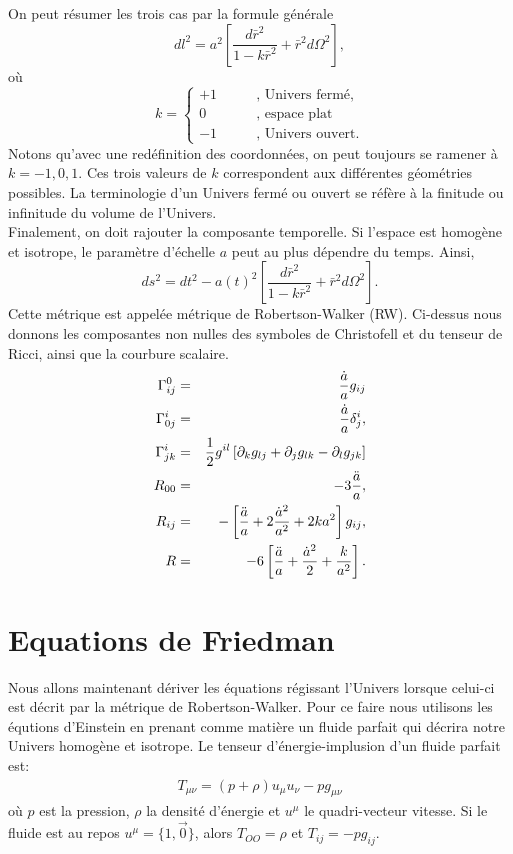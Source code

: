 \documentclass[a4paper,12pt]{report}
\theoremstyle{plain}
\theoremstyle{plain}
\begin{document}
  On peut r\'esumer les trois cas par la formule g\'en\'erale 
  \begin{equation}
  dl^2=a^2\left[ \frac{d\bar{r}^2}{1-k\bar{r}^2} + \bar{r}^2d\Omega^2\right], 
  \end{equation} 
  o\`{u} 
  $$ k= \begin{cases}
   +1& \qquad  \text{, Univers ferm\'e,} \\
   0 &\qquad \text{, espace plat} \\
   -1 &\qquad \text{, Univers ouvert.} 
   \end{cases}$$
   Notons qu'avec une red\'efinition des coordonn\'ees, on peut toujours se ramener \`a\\ $k=-1,0,1$. Ces trois valeurs de $k$ correspondent aux diff\'erentes g\'eom\'etries possibles. La terminologie d'un Univers ferm\'e ou ouvert se r\'ef\`ere \`a la finitude ou infinitude du volume de l'Univers. \\
   
   Finalement, on doit rajouter la composante temporelle. Si l'espace est homog\`ene et isotrope, le param\`etre d'\'echelle $a$ peut au plus d\'ependre du temps. Ainsi, 
   \begin{equation}
    ds^2 = dt^2 -a(t)^2 \left[ \frac{d\bar{r}^2}{1-k\bar{r}^2} +\bar{r}^2 d \Omega ^2\right] .
   \end{equation}
  Cette m\'etrique est appel\'ee m\'etrique de Robertson-Walker (RW). Ci-dessus nous donnons les composantes non nulles des symboles de Christofell et du tenseur de Ricci, ainsi que la courbure scalaire.  
  \begin{eqnarray}
   \Gamma _{ij}^0&= & \frac{\dot{a}}{a} g_{ij} \cr
   \Gamma_{0j}^i &=& \frac{\dot{a}}{a} \delta_j^i, \cr
   \Gamma_{jk}^i &=& \frac{1}{2} g^{il} \left[ \partial_k g_{lj} + \partial_j g_{lk} - \partial_l g_{jk}  \right] \cr
   R_{00}&=& -3 \frac{\ddot{a}}{a}, \cr
   R_{ij}&=& - \left[ \frac{\ddot{a}}{a}+ 2 \frac{\dot{a}^2}{a^2} +2ka^2 \right] g_{ij} , \cr
   R&=& -6 \left[ \frac{\ddot{a}}{a} + \frac{\dot{a}^2}{2} + \frac{k}{a^2} \right]  .   
 \end{eqnarray}
  \section{Equations de Friedman} 
  Nous allons maintenant d\'eriver les \'equations r\'egissant l'Univers lorsque celui-ci est d\'ecrit par la m\'etrique de Robertson-Walker. Pour ce faire nous utilisons les \'equtions d'Einstein en prenant comme mati\`ere un fluide parfait qui d\'ecrira notre Univers homog\`ene et isotrope. Le tenseur d'\'energie-implusion d'un fluide parfait est: 
  \begin{eqnarray}
  T_{\mu \nu }= (p+\rho )u_\mu u _\nu -pg_{\mu \nu }
  \end{eqnarray}
  o\`{u} $p$ est la pression, $\rho $ la densit\'e d'\'energie et $u^\mu $ le quadri-vecteur vitesse. Si le fluide est au repos $u^\mu=\{1, \overrightarrow{0}\} $, alors $T_{OO}= \rho $ et $T_{ij}= -pg_{ij}$. \\
  
\end{document}
